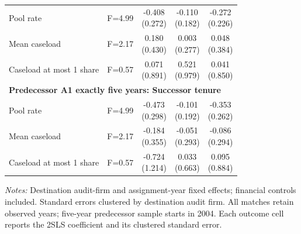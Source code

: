\documentclass[10pt]{article}
\begin{document}
\begin{minipage}{19cm}
\begin{threeparttable}
\begin{tabular}{p{}cccc}
Pool rate & F=4.99 & \shortstack{-0.408\\(0.272)} & \shortstack{-0.110\\(0.182)} & \shortstack{-0.272\\(0.226)} \\
Mean caseload & F=2.17 & \shortstack{0.180\\(0.430)} & \shortstack{0.003\\(0.277)} & \shortstack{0.048\\(0.384)} \\
Caseload at most 1 share & F=0.57 & \shortstack{0.071\\(0.891)} & \shortstack{0.521\\(0.979)} & \shortstack{0.041\\(0.850)} \\
\multicolumn{5}{l}{\textbf{Predecessor A1 exactly five years: Successor tenure}} \\
Pool rate & F=4.99 & \shortstack{-0.473\\(0.298)} & \shortstack{-0.101\\(0.192)} & \shortstack{-0.353\\(0.262)} \\
Mean caseload & F=2.17 & \shortstack{-0.184\\(0.355)} & \shortstack{-0.051\\(0.293)} & \shortstack{-0.086\\(0.294)} \\
Caseload at most 1 share & F=0.57 & \shortstack{-0.724\\(1.214)} & \shortstack{0.033\\(0.663)} & \shortstack{0.095\\(0.884)} \\
\bottomrule
\end{tabular}
\begin{tablenotes}\fontsize{9}{11}\selectfont
\item \raggedright \fontsize{9}{11}\selectfont \textit{Notes:} Destination audit-firm and assignment-year fixed effects; financial controls included. Standard errors clustered by destination audit firm. All matches retain observed years; five-year predecessor sample starts in 2004. Each outcome cell reports the 2SLS coefficient and its clustered standard error.
\end{tablenotes}
\end{threeparttable}

\end{minipage}
\end{document}
